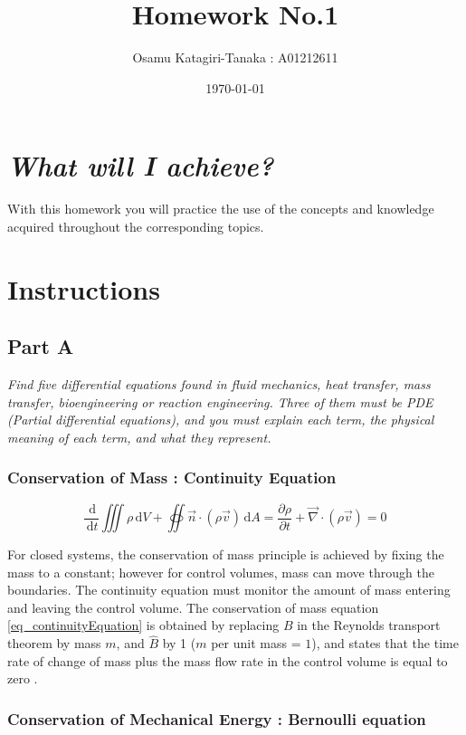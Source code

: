 \documentclass{article}
\title{Homework No.1}
\author{Osamu Katagiri-Tanaka : A01212611}
\date{\today}
\newcommand{\ud}{\,\mathrm{d}}
\begin{document}
\maketitle

\section*{\emph{What will I achieve?}}
With this homework you will practice the use of the concepts and knowledge acquired throughout the corresponding topics.

\section*{Instructions}

\subsection*{Part A}
\textit{Find five differential equations found in fluid mechanics, heat transfer, mass transfer, bioengineering or reaction engineering. Three of them must be PDE (Partial differential equations), and you must explain each term, the physical meaning of each term, and what they represent.}

\subsubsection*{Conservation of Mass : Continuity Equation}

\begin{equation}
\frac{\ud}{\ud t} \iiint \rho \ud V + \oiint \vec{n} \cdot (\rho \vec{v}) \ud A = \frac{\partial \rho}{\partial t} + \vec{\nabla} \cdot (\rho \vec{v}) = 0
\label{eq_continuityEquation}
\end{equation}

For closed systems, the conservation of mass principle is achieved by fixing the mass to a constant; however for control volumes, mass can move through the boundaries. The continuity equation must monitor the amount of mass entering and leaving the control volume. The conservation of mass equation \ref{eq_continuityEquation} is obtained by replacing $B$ in the Reynolds transport theorem by mass $m$, and $\hat{B}$ by 1 ($m$ per unit mass = $1$), and states that the time rate of change of mass plus the mass flow rate in the control volume is equal to zero \cite{White2011, Moukalled2016}.

\subsubsection*{Conservation of Mechanical Energy : Bernoulli equation}
\end{document}
